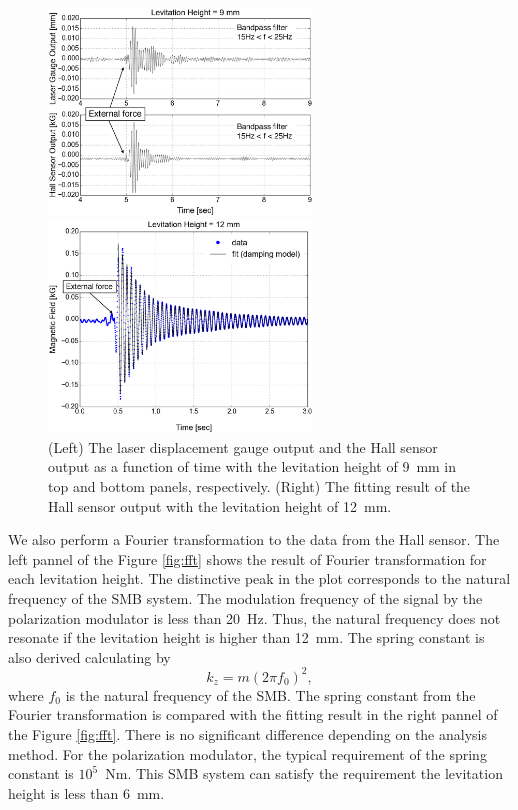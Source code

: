 \documentclass[a4paper]{jpconf}
\begin{document}
\begin{figure}[htbp]
  \centering
  \begin{minipage}{0.45\hsize}
  \includegraphics[width=70mm]{vibration_up.eps}
  \end{minipage}
  \begin{minipage}{0.45\hsize}
    \centering
    \includegraphics[width=70mm]{vibration_fit.eps}
  \end{minipage}
  \caption{(Left) The laser displacement gauge output and the Hall sensor output as a function of time with the levitation height of 9~mm in top and bottom panels, respectively.
    (Right) The fitting result of the Hall sensor output with the levitation height of 12~mm.}
  \label{fig:vibration}
\end{figure}

We also perform a Fourier transformation to the data from the Hall sensor.
The left pannel of the Figure \ref{fig:fft} shows the result of Fourier transformation for each levitation height.
The distinctive peak in the plot corresponds to the natural frequency of the SMB system.
The modulation frequency of the signal by the polarization modulator is less than 20~Hz.
Thus, the natural frequency does not resonate if the levitation height is higher than 12~mm.
The spring constant is also derived calculating by
\begin{equation}
  k_{z} = m (2 \pi f_{0})^{2},
\end{equation}
where $f_{0}$ is the natural frequency of the SMB.
The spring constant from the Fourier transformation is compared with the fitting result in the right pannel of the Figure \ref{fig:fft}.
There is no significant difference depending on the analysis method.
For the polarization modulator, the typical requirement of the spring constant is $10^{5}$~Nm.
This SMB system can satisfy the requirement the levitation height is less than 6~mm.
\end{document}
